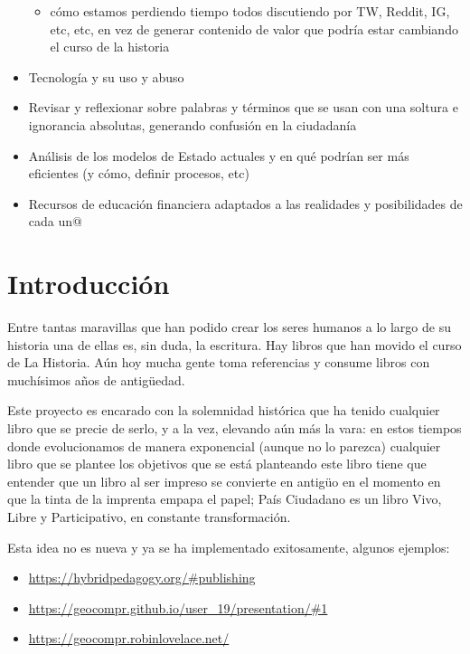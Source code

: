 \documentclass[
]{book}
\providecommand{\tightlist}{%
  \setlength{\itemsep}{0pt}\setlength{\parskip}{0pt}}
\begin{document}
\begin{itemize}
  \begin{itemize}
  \tightlist
  \item
    cómo estamos perdiendo tiempo todos discutiendo por TW, Reddit, IG, etc, etc, en vez de generar contenido de valor que podría estar cambiando el curso de la historia
  \end{itemize}
\item
  Tecnología y su uso y abuso
\item
  Revisar y reflexionar sobre palabras y términos que se usan con una soltura e ignorancia absolutas, generando confusión en la ciudadanía
\item
  Análisis de los modelos de Estado actuales y en qué podrían ser más eficientes (y cómo, definir procesos, etc)
\item
  Recursos de educación financiera adaptados a las realidades y posibilidades de cada un@
\end{itemize}

\hypertarget{intro}{%
\chapter{Introducción}\label{intro}}

Entre tantas maravillas que han podido crear los seres humanos a lo largo de su historia una de ellas es, sin duda, la escritura. Hay libros que han movido el curso de La Historia. Aún hoy mucha gente toma referencias y consume libros con muchísimos años de antigüedad.

Este proyecto es encarado con la solemnidad histórica que ha tenido cualquier libro que se precie de serlo, y a la vez, elevando aún más la vara: en estos tiempos donde evolucionamos de manera exponencial (aunque no lo parezca) cualquier libro que se plantee los objetivos que se está planteando este libro tiene que entender que un libro al ser impreso se convierte en antigüo en el momento en que la tinta de la imprenta empapa el papel; País Ciudadano es un libro Vivo, Libre y Participativo, en constante transformación.

Esta idea no es nueva y ya se ha implementado exitosamente, algunos ejemplos:

\begin{itemize}
\tightlist
\item
  \url{https://hybridpedagogy.org/\#publishing}
\item
  \url{https://geocompr.github.io/user_19/presentation/\#1}
\item
  \url{https://geocompr.robinlovelace.net/}
\end{itemize}
\end{document}
